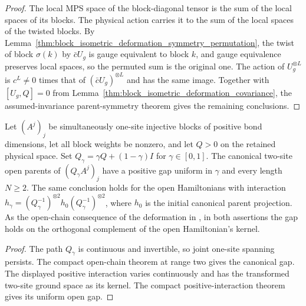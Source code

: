 \begin{proof}
    \leanok
    The local MPS space of the block-diagonal tensor is the sum of the
    local spaces of its blocks. The physical action carries it to the sum
    of the local spaces of the twisted blocks. By
    Lemma~\ref{thm:block_isometric_deformation_symmetry_permutation},
    the twist of block $\sigma(k)$ by $\bar cU_g$ is gauge equivalent to
    block $k$, and gauge equivalence preserves local spaces, so the permuted
    sum is the original one. The action of $U_g^{\otimes L}$ is $c^L\neq0$
    times that of $(\bar cU_g)^{\otimes L}$ and has the same image. Together with $[U_g,Q]=0$ from
    Lemma~\ref{thm:block_isometric_deformation_covariance}, the
    assumed-invariance parent-symmetry theorem gives the remaining
    conclusions.
\end{proof}

\begin{lemma}
    \label{thm:positive_affine_physical_deformation_open_gap}
    \leanok
    Let $(A^j)_j$ be simultaneously one-site injective blocks of positive
    bond dimensions, let all block weights be nonzero, and let $Q>0$ on
    the retained physical space. Set $Q_\gamma=\gamma Q+(1-\gamma)I$ for
    $\gamma\in[0,1]$. The canonical two-site open parents of
    $(Q_\gamma A^j)_j$ have a positive gap uniform in $\gamma$ and every
    length $N\geq2$. The same conclusion holds for the open Hamiltonians
    with interaction
    $h_\gamma=(Q_\gamma^{-1})^{\otimes2}h_0(Q_\gamma^{-1})^{\otimes2}$,
    where $h_0$ is the initial canonical parent projection.
    As the open-chain consequence of the deformation in
    \cite[lines~589--594 and~610--625, Appendix~A]{Schuch2011Phases}, in both
    assertions the gap holds on the orthogonal complement of the open
    Hamiltonian's kernel.
\end{lemma}

\begin{proof}
    \leanok
    The path $Q_\gamma$ is continuous and invertible, so joint one-site
    spanning persists. The compact open-chain theorem at range two gives
    the canonical gap. The displayed positive interaction varies
    continuously and has the transformed two-site ground space
    as its kernel. The compact positive-interaction theorem gives its
    uniform open gap.
\end{proof}

